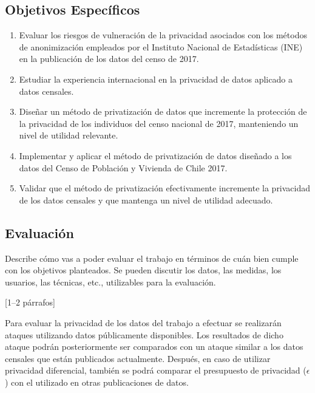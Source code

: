 \documentclass[informe]{upropuesta}
\begin{document}
\subsection*{Objetivos Específicos}\label{sec:obj-e}

\begin{enumerate}

\item Evaluar los riesgos de vulneración de la privacidad asociados con los métodos de anonimización empleados por el Instituto Nacional de Estadísticas (INE) en la publicación de los datos del censo de 2017.

\item Estudiar la experiencia internacional en la privacidad de datos aplicado a datos censales.

\item Diseñar un método de privatización de datos que incremente la protección de la privacidad de los individuos del censo nacional de 2017, manteniendo un nivel de utilidad relevante.

\item Implementar y aplicar el método de privatización de datos diseñado a los datos del Censo de Población y Vivienda de Chile 2017.

\item Validar que el método de privatización efectivamente incremente la privacidad de los datos censales y que mantenga un nivel de utilidad adecuado.

\end{enumerate}

\subsection*{Evaluación}\label{sec:eval}

\begin{pauta}
Describe cómo vas a poder evaluar el trabajo en términos de cuán bien  cumple con los objetivos planteados. Se pueden discutir los datos, las medidas, los usuarios, las técnicas, etc., utilizables para la evaluación.

[1--2 párrafos]
\end{pauta}

Para evaluar la privacidad de los datos del trabajo a efectuar se realizarán ataques utilizando datos públicamente disponibles. Los resultados de dicho ataque podrán posteriormente ser comparados con un ataque similar a los datos censales que están publicados actualmente. Después, en caso de utilizar privacidad diferencial, también se podrá comparar el presupuesto de privacidad ($\epsilon$) con el utilizado en otras publicaciones de datos.
\end{document}
